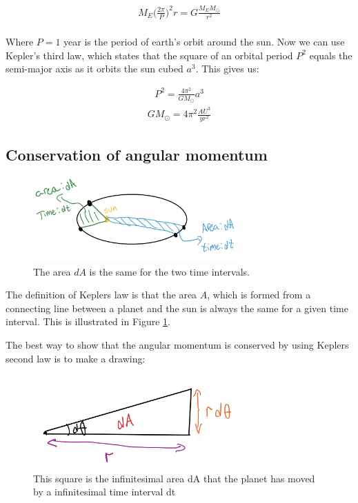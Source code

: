 \documentclass{article}
\begin{document}
\begin{align*}
    M_E\bigg(\frac{2\pi}{P}\bigg)^2r=G\frac{M_EM_{\odot}}{r^2}\\
\end{align*}

Where $P=1$ year is the period of earth's orbit around the sun. Now we can use Kepler's third law, which states that the square of an orbital period $P^2$ equals the semi-major axis as it orbits the sun cubed $a^3$. This gives us:

\begin{align*}
P^2=\frac{4\pi^2}{GM_\odot}a^3
\end{align*}
\begin{align}
    GM_\odot=4\pi^2\frac{AU^3}{yr^2}
    \label{eq:G_M}
\end{align}

\subsection{Conservation of angular momentum}

\begin{figure}[H]
	\centering
	\includegraphics[width=80mm]{K2L.jpg}
	\caption{The area $dA$ is the same for the two time intervals.}
	\label{fig:Kep}
\end{figure}

The definition of Keplers law is that the area $A$, which is formed from a connecting line between a planet and the sun is always the same for a given time interval. This is illustrated in Figure \ref{fig:Kep}.

The best way to show that the angular momentum is conserved by using Keplers second law is to make a drawing:

\begin{figure}[H]
	\centering
	\includegraphics[width=80mm]{sketch.jpg}
	\caption{This square is the infinitesimal area dA that the planet has moved by a infinitesimal time interval dt}
	\label{fig:1bplot}
\end{figure}
\end{document}
